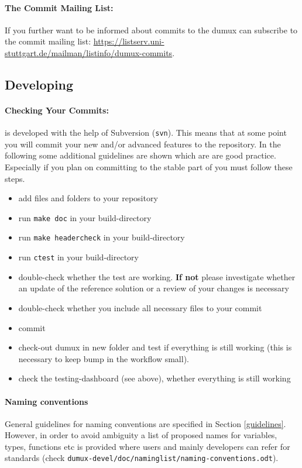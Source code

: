\paragraph{The Commit Mailing List:}
If you further want to be informed about commits to the dumux can subscribe
to the commit mailing list:
\url{https://listserv.uni-stuttgart.de/mailman/listinfo/dumux-commits}.

\subsection{Developing \Dumux}
\paragraph{Checking Your Commits:}
\Dumux is developed with the help of Subversion (\texttt{svn}).
This means that at some point you will commit your new and/or advanced features
to the repository. In the following some additional guidelines are shown which are 
are good practice. Especially if you plan on committing to the stable part of
\Dumux you must follow these steps.
\begin{itemize}
  \item add files and folders to your repository
  \item run \texttt{make doc} in your build-directory
  \item run \texttt{make headercheck} in your build-directory
  \item run \texttt{ctest} in your build-directory
  \item double-check whether the test are working. \textbf{If not} please
        investigate whether an update of the reference solution or a review
        of your changes is necessary
  \item double-check whether you include all necessary files to your commit
  \item commit
  \item check-out dumux in new folder and test if everything is still working
        (this is necessary to keep bump in the workflow small).
  \item check the testing-dashboard (see above), whether everything is still working
\end{itemize}

\paragraph{Naming conventions} 
General guidelines for naming conventions are specified in Section \ref{guidelines}.
However, in order to avoid ambiguity a list of proposed names for variables, types,
functions etc is provided where users and mainly \Dumux developers can refer for
standards (check \texttt{dumux-devel/\allowbreak doc/\allowbreak naminglist/\allowbreak naming-conventions.odt}).

